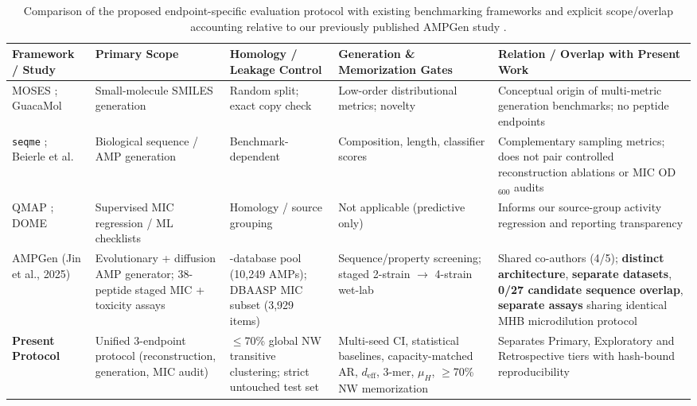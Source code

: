 \documentclass[unnumsec,webpdf,contemporary,large]{oup-authoring-template}
\newcommand{\rev}[1]{#1}
\begin{document}
\begin{table}[t]
\caption{\rev{Comparison of the proposed endpoint-specific evaluation protocol with existing benchmarking frameworks and explicit scope/overlap accounting relative to our previously published AMPGen study \cite{ref9}.}}
\label{tab:framework_overlap}
\centering
\footnotesize
\begin{tabular}{>{\raggedright\arraybackslash}p{2.7cm}>{\raggedright\arraybackslash}p{3.0cm}>{\raggedright\arraybackslash}p{3.0cm}>{\raggedright\arraybackslash}p{3.1cm}>{\raggedright\arraybackslash}p{3.3cm}}
\toprule
\rev{Framework / Study} & \rev{Primary Scope} & \rev{Homology / Leakage Control} & \rev{Generation \& Memorization Gates} & \rev{Relation / Overlap with Present Work} \\
\midrule
\rev{MOSES \cite{ref26}; GuacaMol \cite{ref28}} & \rev{Small-molecule SMILES generation} & \rev{Random split; exact copy check} & \rev{Low-order distributional metrics; novelty} & \rev{Conceptual origin of multi-metric generation benchmarks; no peptide endpoints} \\
\rev{\texttt{seqme} \cite{ref29}; Beierle et al. \cite{ref8}} & \rev{Biological sequence / AMP generation} & \rev{Benchmark-dependent} & \rev{Composition, length, classifier scores} & \rev{Complementary sampling metrics; does not pair controlled reconstruction ablations or MIC OD$_{600}$ audits} \\
\rev{QMAP \cite{ref13}; DOME \cite{ref43}} & \rev{Supervised MIC regression / ML checklists} & \rev{Homology / source grouping} & \rev{Not applicable (predictive only)} & \rev{Informs our source-group activity regression and reporting transparency} \\
\rev{AMPGen (Jin et al., 2025) \cite{ref9}} & \rev{Evolutionary + diffusion AMP generator; 38-peptide staged MIC + toxicity assays} & \rev{6-database pool (10,249 AMPs); DBAASP MIC subset (3,929 items)} & \rev{Sequence/property screening; staged 2-strain $\rightarrow$ 4-strain wet-lab} & \rev{Shared co-authors (4/5); \textbf{distinct architecture}, \textbf{separate datasets}, \textbf{0/27 candidate sequence overlap}, \textbf{separate assays} sharing identical MHB microdilution protocol} \\
\rev{\textbf{Present Protocol}} & \rev{Unified 3-endpoint protocol (reconstruction, generation, MIC audit)} & \rev{$\leq$70\% global NW transitive clustering; strict untouched test set} & \rev{Multi-seed CI, statistical baselines, capacity-matched AR, $d_{\mathrm{eff}}$, 3-mer, $\mu_H$, $\geq$70\% NW memorization} & \rev{Separates Primary, Exploratory and Retrospective tiers with hash-bound reproducibility} \\
\bottomrule
\end{tabular}
\end{table}
\end{document}
